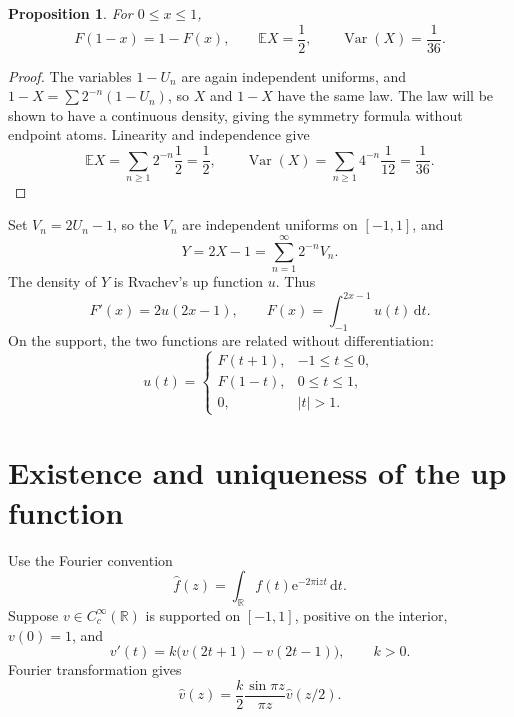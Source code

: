 \documentclass[11pt]{article}
\newtheorem{proposition}[theorem]{Proposition}
\theoremstyle{definition}
\theoremstyle{remark}
\newcommand{\R}{\mathbb R}\newcommand{\C}{\mathbb C}\newcommand{\Z}{\mathbb Z}
\newcommand{\E}{\mathbb E}\newcommand{\Prob}{\mathbb P}
\newcommand{\Var}{\operatorname{Var}}\newcommand{\supp}{\operatorname{supp}}
\newcommand{\dd}{\,\mathrm d}\newcommand{\e}{\mathrm e}\newcommand{\ii}{\mathrm i}
\begin{document}
\begin{proposition}\label{prop:symmetrymoments}
For $0\le x\le1$,
\[
 F(1-x)=1-F(x),
 \qquad \E X=\frac12,
 \qquad \Var(X)=\frac1{36}.
\]
\end{proposition}
\begin{proof}
The variables $1-U_n$ are again independent uniforms, and
$1-X=\sum 2^{-n}(1-U_n)$, so $X$ and $1-X$ have the same law.  The law will be shown to have a continuous density, giving the symmetry formula without endpoint atoms.  Linearity and independence give
\[
 \E X=\sum_{n\ge1}2^{-n}\frac12=\frac12,
 \qquad
 \Var(X)=\sum_{n\ge1}4^{-n}\frac1{12}=\frac1{36}.
\]
\end{proof}

Set $V_n=2U_n-1$, so the $V_n$ are independent uniforms on $[-1,1]$, and
\begin{equation}\label{eq:Y}
 Y=2X-1=\sum_{n=1}^{\infty}2^{-n}V_n.
\end{equation}
The density of $Y$ is Rvachev's up function $u$.  Thus
\begin{equation}\label{eq:F-u-density}
 F'(x)=2u(2x-1),
 \qquad
 F(x)=\int_{-1}^{2x-1}u(t)\dd t.
\end{equation}
On the support, the two functions are related without differentiation:
\begin{equation}\label{eq:u-from-F}
 u(t)=\begin{cases}
 F(t+1),&-1\le t\le0,\\
 F(1-t),&0\le t\le1,\\
 0,&|t|>1.
 \end{cases}
\end{equation}

\section{Existence and uniqueness of the up function}\label{sec:existence}
Use the Fourier convention
\begin{equation}\label{eq:fourier-convention}
 \widehat f(z)=\int_{\R}f(t)\e^{-2\pi\ii zt}\dd t.
\end{equation}
Suppose $v\in C_c^\infty(\R)$ is supported on $[-1,1]$, positive on the interior, $v(0)=1$, and
\begin{equation}\label{eq:general-up}
 v'(t)=k\bigl(v(2t+1)-v(2t-1)\bigr),\qquad k>0.
\end{equation}
Fourier transformation gives
\begin{equation}\label{eq:fourier-scale-general}
 \widehat v(z)=\frac{k}{2}\frac{\sin\pi z}{\pi z}\widehat v(z/2).
\end{equation}
\end{document}
